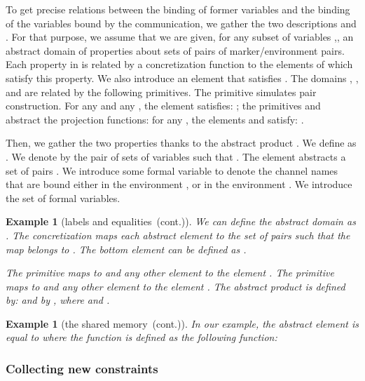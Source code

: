 \documentclass{article}
\newcommand{\boxexample}{}
\newtheorem{example}[thm]{Example}
\newcommand{\continued}{(cont.)}
\newcommand{\cfadomain}{labels and equalities}
\newcommand{\ccfadomain}{\cfadomain\ \continued}
\newcommand{\shareanalysis}{the shared memory}
\newcommand{\cflowanalysis}{\shareanalysis\ \continued}
\begin{document}
To get precise relations between the binding of former variables and the binding of the variables bound by the communication, we gather the two descriptions  and . 
For that purpose, we assume that we are given, for any subset of variables ,, 
an abstract domain  of properties about 
sets of pairs of marker/environment pairs.
Each property in  is related by a concretization function  to the elements of  which satisfy this property.
We also introduce an element  that satisfies .
The domains , , and  are related by the following primitives. 
The primitive  simulates pair construction.
For any  and any , the element  satisfies: ;
the primitives  and  abstract the projection functions: 
for any , the elements  and  satisfy:
 .

Then, we gather the two properties thanks to the abstract product . 
We define  as . 
We denote by  the pair of sets of variables such that . The element  abstracts a set of pairs . We introduce some formal variable to denote the channel names that are bound  either in the environment , or in the environment . We introduce the set  of formal variables. 

\begin{example}[\ccfadomain]
We can define the abstract domain  as . 
The concretization  maps each abstract element  to the set of pairs  such that the map  belongs to . 
The bottom element  can be defined as .

The primitive  maps 
 to  and any other element  to the element . 
The primitive   maps  to 
 and any  other element  to the element . 
The abstract product is defined by: 
 and by 
, where  and .
\boxexample\end{example}



\begin{example}[\cflowanalysis]
In our example, the abstract element  is equal to  where the function   is defined as the following function:

\boxexample\end{example}





\subsubsection{Collecting new constraints}
\end{document}
